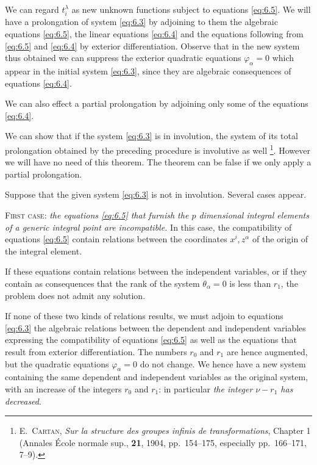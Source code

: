 \documentclass[leqno,11pt]{book}
\numberwithin{equation}{chapter}
\theoremstyle{shape1}
\theoremstyle{shape0}
\theoremstyle{shape2}
\theoremstyle{definition}
\begin{document}
We can regard $t_{i}^{\lambda}$ as new unknown functions subject to equations \eqref{eq:6.5}. We will have a prolongation of system \eqref{eq:6.3} by adjoining to them the algebraic equations \eqref{eq:6.5}, the linear equations \eqref{eq:6.4} and the equations following from \eqref{eq:6.5} and \eqref{eq:6.4} by exterior differentiation. Observe that in the new system thus obtained we can suppress the exterior quadratic equations $\varphi_{\alpha}=0$ which appear in the initial system \eqref{eq:6.3}, since they are algebraic consequences of equations \eqref{eq:6.4}.

We can also effect a partial prolongation by adjoining only some of the equations \eqref{eq:6.4}.

We can show that if the system \eqref{eq:6.3} is in involution, the system of its total prolongation obtained by the preceding procedure is involutive as well \footnote{\textsc{E.~Cartan}, \emph{Sur la structure des groupes infinis de transformations}, Chapter 1 (Annales \'Ecole normale sup., \textbf{21}, 1904, pp.~154--175, especially pp.~166--171, \textsection{}7--9).}. However we will have no need of this theorem. The theorem can be false if we only apply a partial prolongation.

\vspace{12pt}\fsec Suppose that the given system \eqref{eq:6.3} is not in involution. Several cases appear.

\vspace{12pt}\textsc{First case}: \emph{the equations \eqref{eq:6.5} that furnish the $p$ dimensional integral elements of a generic integral point are incompatible.} In this case, the compatibility of equations \eqref{eq:6.5} contain relations between the coordinates $x^{i},z^{\alpha}$ of the origin of the integral element.

If these equations contain relations between the independent variables, or if they contain as consequences that the rank of the system $\theta_{\alpha}=0$ is less than $r_{1}$, the problem does not admit any solution.

If none of these two kinds of relations results, we must adjoin to equations \eqref{eq:6.3} the algebraic relations between the dependent and independent variables expressing the compatibility of equations \eqref{eq:6.5} as well as the equations that result from exterior differentiation. The numbers $r_{0}$ and $r_{1}$ are hence augmented, but the quadratic equations $\varphi_{\alpha}=0$ do not change. We hence have a new system containing the same dependent and independent variables as the original system, with an increase of the integers $r_{0}$ and $r_{1}$: in particular \emph{the integer $\nu-r_{1}$ has decreased}.
\end{document}
